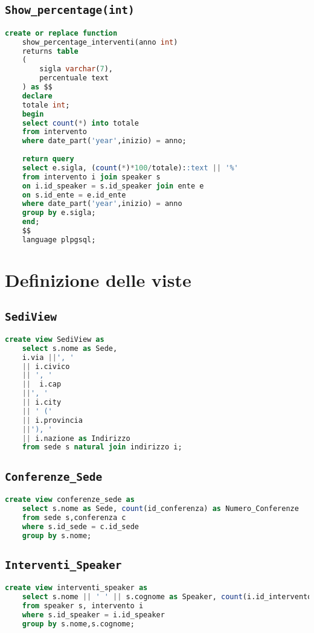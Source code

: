 \subsection{\texttt{Show\_percentage(int)}}
\begin{lstlisting}[language=SQL,style=mystyle]
	create or replace function 
	show_percentage_interventi(anno int)
	returns table
	(
		sigla varchar(7),
		percentuale text
	) as $$
	declare
	totale int;
	begin
	select count(*) into totale
	from intervento
	where date_part('year',inizio) = anno;
	
	return query
	select e.sigla, (count(*)*100/totale)::text || '%'
	from intervento i join speaker s 
	on i.id_speaker = s.id_speaker join ente e 
	on s.id_ente = e.id_ente
	where date_part('year',inizio) = anno
	group by e.sigla;
	end;
	$$ 
	language plpgsql;
\end{lstlisting}
\section{Definizione delle viste}
\subsection{\texttt{SediView}}
\begin{lstlisting}[language=SQL,style=mystyle]
	create view SediView as 
	select s.nome as Sede, 
	i.via ||', ' 
	|| i.civico
	|| ', ' 
	||  i.cap 
	||', ' 
	|| i.city 
	|| ' (' 
	|| i.provincia 
	||'), '
	|| i.nazione as Indirizzo
	from sede s natural join indirizzo i;
\end{lstlisting}
\subsection{\texttt{Conferenze\_Sede}}
\begin{lstlisting}[language=SQL,style=mystyle]
	create view conferenze_sede as
	select s.nome as Sede, count(id_conferenza) as Numero_Conferenze
	from sede s,conferenza c
	where s.id_sede = c.id_sede
	group by s.nome;
\end{lstlisting}
\subsection{\texttt{Interventi\_Speaker}}
\begin{lstlisting}[language=SQL,style=mystyle]
	create view interventi_speaker as
	select s.nome || ' ' || s.cognome as Speaker, count(i.id_intervento)
	from speaker s, intervento i 
	where s.id_speaker = i.id_speaker
	group by s.nome,s.cognome;
\end{lstlisting}
